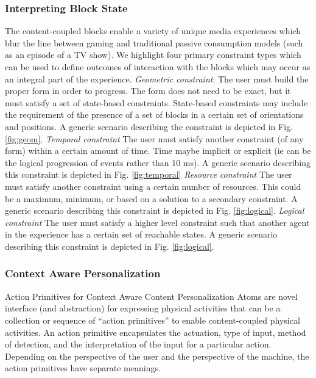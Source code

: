 \documentclass[]{article}
\begin{document}
\subsubsection{Interpreting Block State}
The content-coupled blocks enable a variety of unique media experiences which blur the line between gaming and traditional passive consumption models (such as an episode of a TV show). We highlight four primary constraint types which can be used to define outcomes of interaction with the blocks which may occur as an integral part of the experience. 
\newline
\newline
\emph{Geometric constraint}: The user must build the proper form in order to progress. The form does not need to be exact, but it must satisfy a set of state-based constraints. State-based constraints may include the requirement of the presence of a set of blocks in a certain set of orientations and positions. A generic scenario describing the constraint is depicted in Fig. \ref{fig:geom}.
\newline
\newline 
\emph{Temporal constraint} The user must satisfy another constraint (of any form) within a certain amount of time. Time maybe implicit or explicit (ie can be the logical progression of events rather than 10 ms). A generic scenario describing this constraint is depicted in Fig. \ref{fig:temporal}
\newline
\newline
\emph{Resource constraint} The user must satisfy another constraint using a certain number of resources. This could be a maximum, minimum, or based on a solution to a secondary constraint. A generic scenario describing this constraint is depicted in Fig. \ref{fig:logical}.
\newline
\newline
\emph{Logical constraint} The user must satisfy a higher level constraint such that another agent in the experience has a certain set of reachable states. A generic scenario describing this constraint is depicted in Fig. \ref{fig:logical}.



\subsubsection{Context Aware Personalization}
Action Primitives for Context Aware Content Personalization
Atoms are novel interface (and abstraction) for expressing physical activities that can be a collection or sequence of “action primitives” to enable content-coupled physical activities. An action primitive encapsulates the actuation, type of input, method of detection, and the interpretation of the input for a particular action. Depending on the perspective of the user and the perspective of the machine, the action primitives have separate meanings.
\end{document}

